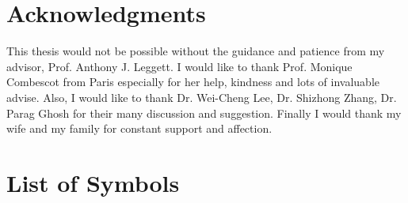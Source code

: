 \documentclass[edeposit,fullpage]{uiucthesis2009}
\begin{document}
\chapter*{Acknowledgments}
This thesis would not be possible without the guidance and patience from my advisor, Prof. Anthony J. Leggett.  I would like to thank Prof. Monique Combescot from Paris especially for her help, kindness and lots of invaluable advise.  Also, I would like to thank Dr. Wei-Cheng Lee, Dr. Shizhong Zhang, Dr. Parag Ghosh for their many discussion and suggestion.  Finally I would thank my wife and my family for constant support and affection.  


\tableofcontents

%

\chapter{List of Symbols}
\end{document}
